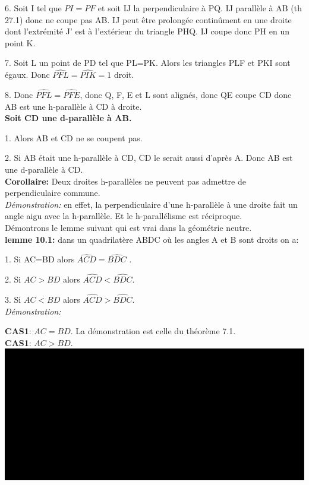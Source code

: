 \documentclass[a4paper, 12pt, twoside]{book}
\begin{document}
   6. Soit I tel que $PI=PF$ et soit IJ la perpendiculaire à PQ. IJ parallèle à AB (th 27.1) donc ne coupe pas AB. IJ peut être prolongée continûment en une droite dont l'extrémité J' est à l'extérieur du triangle PHQ. IJ coupe donc PH en un point K.\
   
   7. Soit L un point de PD tel que PL=PK. Alors les triangles PLF et PKI sont égaux. Donc  $\hat{PFL}=\hat{PIK}=1$ droit.\
   
   8. Donc   $\hat{PFL}=\hat{PFE}$, donc Q, F, E et L sont alignés, donc QE coupe CD donc AB est une h-parallèle à CD à droite.\\
   
   \textbf{Soit CD une d-parallèle à AB.}\
   
   1. Alors AB et CD ne se coupent pas.\
   
   2. Si AB était une h-parallèle à CD, CD le serait aussi d'après A. Donc AB est une d-parallèle à CD.\\
   
   
   \textbf{Corollaire:} Deux droites h-parallèles ne peuvent pas admettre de perpendiculaire commune.\\
   
   \textit{ Démonstration:} en effet, la perpendiculaire d'une h-parallèle à une droite fait un angle aigu avec la h-parallèle. Et le h-parallélisme est réciproque.\\
   
   
   Démontrons le lemme suivant qui est vrai dans la géométrie neutre.\\
   
   
 \textbf{lemme 10.1:} dans un quadrilatère ABDC où les angles A et B sont droits on a:\
 
 1. Si AC=BD alors $\hat{ACD}=\hat{BDC}$   .\
 
 2. Si $AC>BD$ alors $\hat{ACD}<\hat{BDC}$.\
 
 3. Si $AC<BD$ alors $\hat{ACD}>\hat{BDC}$.\\
 
 \textit{Démonstration:}\
 
\textbf{ CAS1}: $AC=BD$. La démonstration est celle du théorème 7.1.\\


\textbf{ CAS1}: $AC>BD$.\\

 
   \includegraphics[scale=0.2]{figures/Lobat8bis.eps}\ 
   
\end{document}
